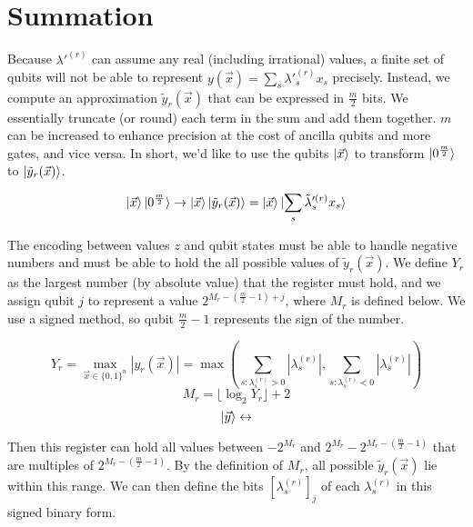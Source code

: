 \section{Summation}

Because $\lambda'^{(r)}$ can assume any real (including irrational) values, a finite set of qubits will not be able to represent $y(\vec{x}) = \sum_s \lambda'^{(r)}_s x_s$ precisely. Instead, we compute an approximation $\tilde{y}_r(\vec{x})$ that can be expressed in $\frac{m}{2}$ bits. We essentially truncate (or round) each term in the sum and add them together. $m$ can be increased to enhance precision at the cost of ancilla qubits and more gates, and vice versa. In short, we'd like to use the qubits $\ket{\vec{x}}$ to transform $\ket{0^{\frac{m}{2}}}$ to $\ket{\tilde{y}_r(\vec{x})}$.

\begin{equation}
    \ket{\vec{x}}\ket{0^{\frac{m}{2}}} \rightarrow \ket{\vec{x}}\ket{\tilde{y}_r(\vec{x})} = \ket{\vec{x}}\ket{\sum_s \tilde{\lambda}'^{(r)}_s x_s}
    \label{eq: summation}
\end{equation}

The encoding between values $z$ and qubit states must be able to handle negative numbers and must be able to hold the all possible values of $\tilde{y}_r(\vec{x})$. We define $Y_r$ as the largest number (by absolute value) that the register must hold, and we assign qubit $j$ to represent a value $2^{M_r - (\frac{m}{2} - 1) + j}$, where $M_r$ is defined below. We use a signed method, so qubit $\frac{m}{2} - 1$ represents the sign of the number. 

\begin{equation}
    Y_r = \max_{\vec{x} \in \{0, 1\}^n} |y_r(\vec{x})| = \max\left(\sum_{s : \lambda^{(r)}_s > 0} |\lambda^{(r)}_s|, \sum_{s : \lambda^{(r)}_s < 0} |\lambda^{(r)}_s|\right)
\end{equation}
\begin{equation}
    M_r = \lfloor \log_2{Y_r} \rfloor + 2
\end{equation}
\begin{equation}
    \ket{\vec{y}} \leftrightarrow 
\end{equation}

Then this register can hold all values between $-2^{M_r}$ and $2^{M_r} - 2^{M_r - (\frac{m}{2} - 1)}$ that are multiples of $2^{M_r - (\frac{m}{2} - 1)}$. By the definition of $M_r$, all possible $\tilde{y}_r(\vec{x})$ lie within this range. We can then define the bits $[\lambda^{(r)}_s]_j$ of each $\lambda^{(r)}_s$ in this signed binary form.

